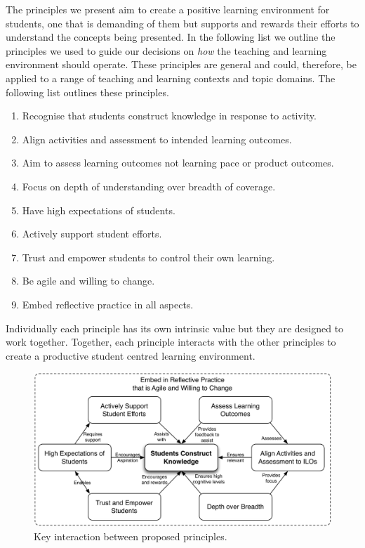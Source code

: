The principles we present aim to create a positive learning environment for students, one that is demanding of them but supports and rewards their efforts to understand the concepts being presented. In the following list we outline the principles we used to guide our decisions on \emph{how} the teaching and learning environment should operate. These principles are general and could, therefore, be applied to a range of teaching and learning contexts and topic domains. The following list outlines these principles.

\begin{enumerate}
	\item Recognise that students construct knowledge in response to activity.
	\item Align activities and assessment to intended learning outcomes.
	\item Aim to assess learning outcomes not learning pace or product outcomes.
	\item Focus on depth of understanding over breadth of coverage.
	\item Have high expectations of students.
	\item Actively support student efforts.
	\item Trust and empower students to control their own learning.
	\item Be agile and willing to change.
	\item Embed reflective practice in all aspects.
\end{enumerate}


Individually each principle has its own intrinsic value but they are designed to work together. Together, each principle interacts with the other principles to create a productive student centred learning environment.

\begin{figure}[htbp]
	\centering
	\includegraphics[width=\textwidth]{HowPrinciples}
	\caption{Key interaction between proposed principles.}
	\label{fig:how_principles}
\end{figure}

